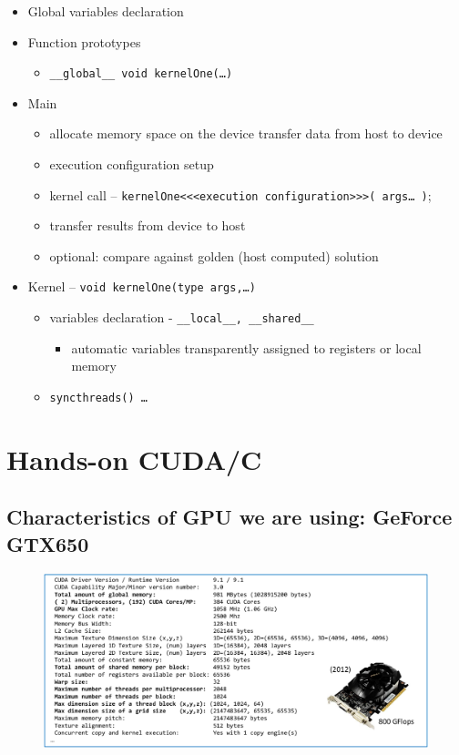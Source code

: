 \begin{tcolorbox}[width=\textwidth,colback={white},title={Recap: CUDA program structure},colbacktitle=cyan,coltitle=black]
	\begin{itemize}
		\item Global variables declaration
		\item Function prototypes
		\begin{itemize}
			\item \texttt{\_\_global\_\_ void kernelOne(…)}
		\end{itemize}
		\item Main
		\begin{itemize}
			\item allocate memory space on the device transfer data from host to device
			\item execution configuration setup
			\item kernel call – \texttt{kernelOne<<<execution configuration>>>( args… )};
			\item transfer results from device to host
			\item optional: compare against golden (host computed) solution
		\end{itemize}
		\item Kernel – \texttt{void kernelOne(type args,…)}
		\begin{itemize}
			\item variables declaration - \texttt{\_\_local\_\_, \_\_shared\_\_} 
			\begin{itemize}
				\item automatic variables transparently assigned to registers or local memory
			\end{itemize}
			\item \texttt{syncthreads() …}
		\end{itemize}
	\end{itemize}  
\end{tcolorbox}




\newpage

\section{Hands-on CUDA/C}
\subsection{Characteristics of GPU we are using: GeForce GTX650}
\begin{figure}[ht]
	\centering
	\includegraphics[width=1\textwidth]{figure_parallel/gtx650.png}
\end{figure}

